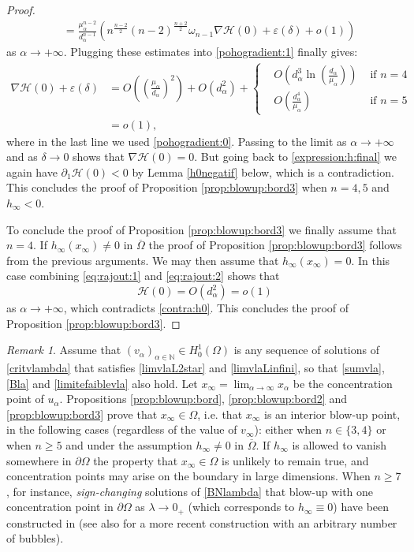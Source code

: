 \documentclass[10pt]{amsart}
\numberwithin{equation}{section}
\newcommand{\ve}{\varepsilon}
\newcommand{\Om}{\Omega}
\newcommand{\ma}{\mu_\alpha}
\def \ma{\mu_{\alpha}}
\def \va{v_{\alpha}}
\def \vo {v_{\infty}}
\def \nn{\mathbb{N}}
\def \h{\mathcal{H}}
\def \da{d_{\alpha}}
\theoremstyle{plain}
\theoremstyle{remark}
\newtheorem{rem}{Remark}[section]
\begin{document}
\begin{proof}
$$\begin{aligned}
& =  \frac{\ma^{n-2}}{\da^{n-1}} \left(  n^{\frac{n-2}{2}} (n-2)^{\frac{n+2}{2}} \omega_{n-1} \nabla \h(0) + \ve(\delta)  + o(1) \right)
\end{aligned}   $$ 
as $ \alpha \to + \infty$. Plugging these estimates into \eqref{pohogradient:1} finally gives: 
$$ \begin{aligned} \nabla \h(0) + \ve(\delta) & = O \left( \left( \frac{\ma}{\da} \right)^2\right) + O(\da^2) + 
\left \{
\begin{aligned}
& O \left( \da^3 \ln \left(\frac{d_\alpha}{\ma}\right) \right)& \text{ if } n = 4 \\
& O \left( \frac{\da^4}{\ma} \right) &  \text{ if } n = 5
\end{aligned}  \right.   \\
& = o(1),
\end{aligned} $$ 
where in the last line we used \eqref{pohogradient:0}. Passing to the limit as $\alpha \to + \infty$ and as $\delta \to 0$ shows that $\nabla \h(0) = 0$. But going back to \eqref{expression:h:final} we again have $\partial_1 \h(0) < 0$ by Lemma \ref{h0negatif} below, which is a contradiction. This concludes the proof of Proposition \ref{prop:blowup:bord3} when $n=4,5$ and $h_\infty <0$.

To conclude the proof of Proposition \ref{prop:blowup:bord3} we finally assume that $n=4$. If $h_\infty(x_\infty) \neq 0$ in $\overline{\Om}$ the proof of Proposition \ref{prop:blowup:bord3} follows from the previous arguments. We may then assume that $h_\infty(x_\infty) = 0$. In this case combining \eqref{eq:rajout:1} and \eqref{eq:rajout:2} shows that 
$$ \h(0) = O(d_\alpha^2) = o(1) $$
as $\alpha \to + \infty$, which contradicts \eqref{contra:h0}. This concludes the proof of Proposition  \ref{prop:blowup:bord3}.
\end{proof}

\begin{rem} \label{concentration:au:bord}
Assume that $(\va)_{\alpha\in\nn}\in H_0^1(\Om)$ is any sequence of solutions of \eqref{critvlambda} that satisfies \eqref{limvlaL2star} and \eqref{limvlaLinfini}, so that \eqref{sumvla}, \eqref{Bla} and \eqref{limitefaiblevla} also hold. Let $x_\infty = \lim_{\alpha \to  \infty} x_\alpha$ be the concentration point of $u_\alpha$. Propositions \ref{prop:blowup:bord}, \ref{prop:blowup:bord2} and \ref{prop:blowup:bord3} prove that $x_\infty \in \Om$, i.e. that $x_\infty$ is an interior blow-up point, in the following cases (regardless of the value of $\vo$): either when $n \in \{3,4\} $ or when $n \ge 5$ and under the assumption $h_\infty \neq 0$ in $\overline{\Om}$. If $h_\infty$ is allowed to vanish somewhere in $\partial \Om$ the property that $x_\infty \in  \Om$ is unlikely to remain true, and concentration points may arise on the boundary in large dimensions. When $n \ge 7$, for instance, \emph{sign-changing} solutions of \eqref{BNlambda} that blow-up with one concentration point in $\partial \Om$ as $\lambda \to 0_+$ (which corresponds to $h_\infty \equiv 0$) have been constructed in \cite{vaira2015new} (see also \cite{musso2024nodal} for a more recent construction with an arbitrary number of bubbles).
\end{rem}
\end{document}
